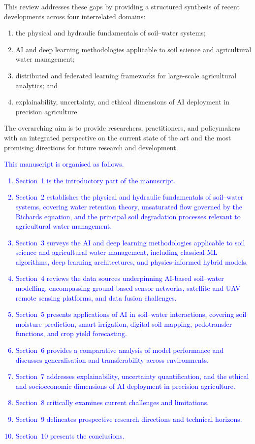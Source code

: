 \documentclass[land,article,submit,pdftex,moreauthors]{Definitions/mdpi}
\numberwithin{equation}{section}
\begin{document}
This review addresses these gaps by providing a structured synthesis of recent developments across four interrelated domains: 
\begin{enumerate}[label=(\roman*)]
    \item the physical and hydraulic fundamentals of soil--water systems;
    \item AI and deep learning methodologies applicable to soil science and agricultural water management;
    \item distributed and federated learning frameworks for large-scale agricultural analytics; and
    \item explainability, uncertainty, and ethical dimensions of AI deployment in precision agriculture.
\end{enumerate}

The overarching aim is to provide researchers, practitioners, and policymakers with an integrated perspective on the current state of the art and the most promising directions for future research and development.

\textcolor{blue}{This manuscript is organised as follows. 
\begin{enumerate}[label=(\roman*)]
\item Section~1 is the introductory part of the manuscript.
\item Section~2 establishes the physical and hydraulic fundamentals of soil--water systems, covering water retention theory, unsaturated flow governed by the Richards equation, and the principal soil degradation processes relevant to agricultural water management. 
\item Section~3 surveys the AI and deep learning methodologies applicable to soil science and agricultural water management, including classical ML algorithms, deep learning architectures, and physics-informed hybrid models. 
\item Section~4 reviews the data sources underpinning AI-based soil--water modelling, encompassing ground-based sensor networks, satellite and UAV remote sensing platforms, and data fusion challenges. \item Section~5 presents applications of AI in soil--water interactions, covering soil moisture prediction, smart irrigation, digital soil mapping, pedotransfer functions, and crop yield forecasting. 
\item Section~6 provides a comparative analysis of model performance and discusses generalisation and transferability across environments. 
\item Section~7 addresses explainability, uncertainty quantification, and the ethical and socioeconomic dimensions of AI deployment in precision agriculture. 
\item Section~8 critically examines current challenges and limitations.
\item Section~9 delineates prospective research directions and technical horizons. 
\item Section~10 presents the conclusions.
\end{enumerate}}
\end{document}
